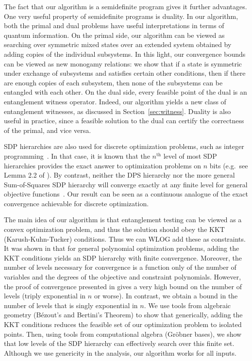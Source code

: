 \documentclass[aps,pra,notitlepage,preprintnumbers,11pt,tightenlines]{revtex4-1}
\begin{document}
The fact that our algorithm is a semidefinite program gives it further
advantages. One very useful property of semidefinite programs is
duality. In our algorithm, both the primal and dual problems have useful
interpretations in terms of quantum information. On the primal side,
our algorithm can be viewed as searching over symmetric mixed states over
an extended system obtained by adding copies of the individual subsystems. In this light, our convergence bounds can be viewed as
new monogamy relations: we show that if a state is symmetric under
exchange of subsystems and satisfies certain other conditions, then if
there are enough copies of each subsystem, then none of the subsystems
can be entangled with each other. On the dual side, every feasible point of the
dual is an entanglement witness operator. Indeed, our algorithm yields
a new class of
entanglement witnesses, as discussed in
Section~\ref{sec:witness}. Duality is also useful in practice, since a
feasible solution to the dual can certify the correctness of the
primal, and vice versa.

SDP hierarchies are also used for discrete optimization problems, such
as integer programming~\cite{barak:2014}.  In that case, it is known that the $n^{\text{th}}$ level of
most SDP hierarchies provides the exact answer to optimization
problems on $n$ bits (e.g.~see Lemma 2.2 of \cite{barak:2014}).  By
contrast, neither the DPS hierarchy nor the 
more general Sum-of-Squares SDP hierarchy will converge exactly at any
finite level for general objective functions~\cite{dps:2003}.  Our result can be seen
as a continuous analogue of the exact convergence achievable for
discrete optimization.  

The main idea of our algorithm is that entanglement testing can be
viewed as a convex optimization problem, and thus the solution should
obey the KKT (Karush-Kuhn-Tucker) conditions.  Thus we can WLOG add
these as constraints.  It was shown
in \cite{nie:2010} that for general polynomial optimization problems,
adding the KKT conditions yields an SDP hierarchy with finite
convergence. Moreover, the number of levels necessary for convergence
is a function only of the number of variables and the degrees of the
objective and constraint polynomials. However, the proof of
convergence presented in \cite{nie:2010} gives a very high bound on the number of levels (triply
exponential in $n$ or worse). In contrast, we obtain a bound in the
number of levels that is singly exponential in $n$. We use tools from
algebraic geometry (B\'{e}zout's and Bertini's Theorem) to show that
generically, adding
the KKT conditions reduces the feasible set of our optimization
problem to isolated points. Then, using tools from
computational algebra (Gr\"{o}bner bases), we show that low levels of
the SDP hierarchy can effectively search over this finite
set. Although we use genericity in the analysis, our algorithm works
for all inputs. 
\end{document}
